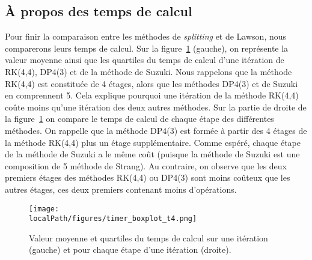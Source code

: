 
\subsection{À propos des temps de calcul}
\label{ssec:2:time}

Pour finir la comparaison entre les méthodes de \emph{splitting} et de Lawson, nous comparerons leurs temps de calcul. Sur la figure~\ref{fig:timer_boxplot_t4} (gauche), on représente la valeur moyenne ainsi que les quartiles du temps de calcul d'une itération de RK(4,4), DP4(3) et de la méthode de Suzuki. Nous rappelons que la méthode RK(4,4) est constituée de 4 étages, alors que les méthodes DP4(3) et de Suzuki en comprennent 5. Cela explique pourquoi une itération de la méthode RK(4,4) coûte moins qu'une itération des deux autres méthodes. Sur la partie de droite de la figure~\ref{fig:timer_boxplot_t4} on compare le temps de calcul de chaque étape des différentes méthodes. On rappelle que la méthode DP4(3) est formée à partir des 4 étages de la méthode RK(4,4) plus un étage supplémentaire. Comme espéré, chaque étape de la méthode de Suzuki a le même coût (puisque la méthode de Suzuki est une composition de 5 méthode de Strang). Au contraire, on observe que les deux premiers étages des méthodes RK(4,4) ou DP4(3) sont moins coûteux que les autres étages, ces deux premiers contenant moins d'opérations.

\begin{figure}[h]
  \centering
  \texttt{[image: \\localPath/figures/timer\_boxplot\_t4.png]}
  \caption{Valeur moyenne et quartiles du temps de calcul sur une itération (gauche) et pour chaque étape d'une itération (droite).}
  \label{fig:timer_boxplot_t4}
\end{figure}
